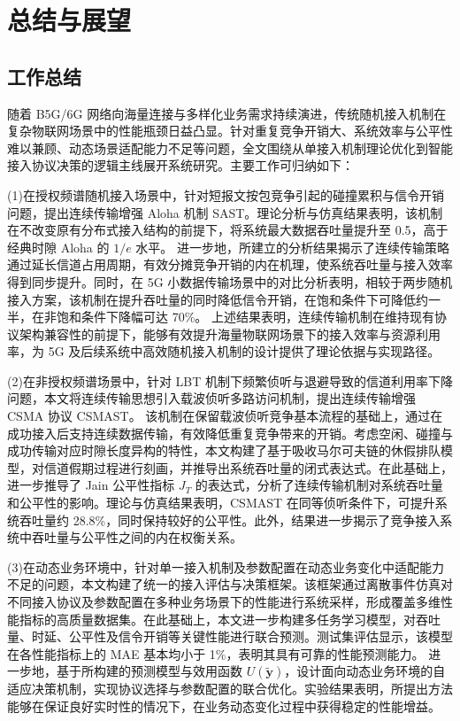 \chapter{总结与展望}
\label{chap:conclusion}

\section{工作总结}

随着 B5G/6G 网络向海量连接与多样化业务需求持续演进，传统随机接入机制在复杂物联网场景中的性能瓶颈日益凸显。针对重复竞争开销大、系统效率与公平性难以兼顾、动态场景适配能力不足等问题，全文围绕从单接入机制理论优化到智能接入协议决策的逻辑主线展开系统研究。主要工作可归纳如下：

(1)在授权频谱随机接入场景中，针对短报文按包竞争引起的碰撞累积与信令开销问题，提出连续传输增强 Aloha 机制 SAST。理论分析与仿真结果表明，该机制在不改变原有分布式接入结构的前提下，将系统最大数据吞吐量提升至 0.5，高于经典时隙 Aloha 的 $1/e$ 水平。
进一步地，所建立的分析结果揭示了连续传输策略通过延长信道占用周期，有效分摊竞争开销的内在机理，使系统吞吐量与接入效率得到同步提升。同时，在 5G 小数据传输场景中的对比分析表明，相较于两步随机接入方案，该机制在提升吞吐量的同时降低信令开销，在饱和条件下可降低约一半，在非饱和条件下降幅可达 70\%。
上述结果表明，连续传输机制在维持现有协议架构兼容性的前提下，能够有效提升海量物联网场景下的接入效率与资源利用率，为 5G 及后续系统中高效随机接入机制的设计提供了理论依据与实现路径。


(2)在非授权频谱场景中，针对 LBT 机制下频繁侦听与退避导致的信道利用率下降问题，本文将连续传输思想引入载波侦听多路访问机制，提出连续传输增强 CSMA 协议 CSMAST。
该机制在保留载波侦听竞争基本流程的基础上，通过在成功接入后支持连续数据传输，有效降低重复竞争带来的开销。考虑空闲、碰撞与成功传输对应时隙长度异构的特性，本文构建了基于吸收马尔可夫链的休假排队模型，对信道假期过程进行刻画，并推导出系统吞吐量的闭式表达式。在此基础上，进一步推导了 Jain 公平性指标 $J_T$ 的表达式，分析了连续传输机制对系统吞吐量和公平性的影响。理论与仿真结果表明，CSMAST 在同等侦听条件下，可提升系统吞吐量约 28.8\%，同时保持较好的公平性。此外，结果进一步揭示了竞争接入系统中吞吐量与公平性之间的内在权衡关系。

(3)在动态业务环境中，针对单一接入机制及参数配置在动态业务变化中适配能力不足的问题，本文构建了统一的接入评估与决策框架。该框架通过离散事件仿真对不同接入协议及参数配置在多种业务场景下的性能进行系统采样，形成覆盖多维性能指标的高质量数据集。在此基础上，本文进一步构建多任务学习模型，对吞吐量、时延、公平性及信令开销等关键性能进行联合预测。测试集评估显示，该模型在各性能指标上的 MAE 基本均小于 1\%，表明其具有可靠的性能预测能力。
进一步地，基于所构建的预测模型与效用函数 $U(\tilde{\mathbf{y}})$，设计面向动态业务环境的自适应决策机制，实现协议选择与参数配置的联合优化。实验结果表明，所提出方法能够在保证良好实时性的情况下，在业务动态变化过程中获得稳定的性能增益。



